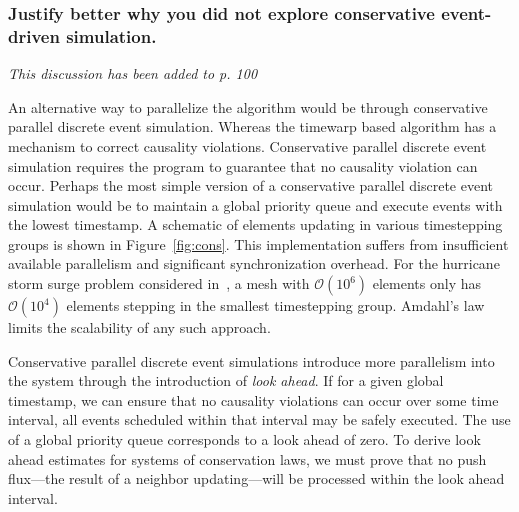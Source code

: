 \documentclass[10pt,letterpaper]{article}
\begin{document}
\subsubsection*{Justify better why you did not explore conservative event-driven simulation.}

{\it This discussion has been added to p. 100}


An alternative way to parallelize the algorithm would be through conservative parallel discrete event simulation. Whereas the timewarp based algorithm has a mechanism to correct causality violations. Conservative parallel discrete event simulation requires the program to guarantee that no causality violation can occur. Perhaps the most simple version of a conservative parallel discrete event simulation would be to maintain a global priority queue and execute events with the lowest timestamp. A schematic of elements updating in various timestepping groups is shown in Figure~\ref{fig:cons}. This implementation suffers from insufficient available parallelism and significant synchronization overhead. For the hurricane storm surge problem considered in~\cite{Dawson2013}, a mesh with $\mathcal{O}(10^6)$ elements only has $\mathcal{O}(10^4)$ elements stepping in the smallest timestepping group. Amdahl's law limits the scalability of any such approach.

Conservative parallel discrete event simulations introduce more parallelism into the system through the introduction of {\em look ahead}. If for a given global timestamp, we can ensure that no causality violations can occur over some time interval, all events scheduled within that interval may be safely executed. The use of a global priority queue corresponds to a look ahead of zero. To derive look ahead estimates for systems of conservation laws, we must prove that no push flux---the result of a neighbor updating---will be processed within the look ahead interval. 
\end{document}
